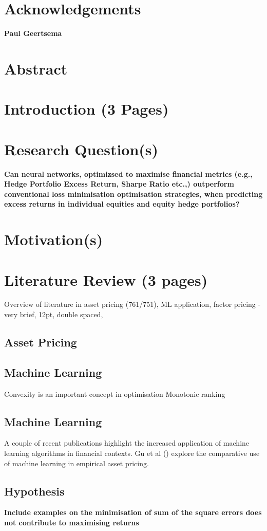 \documentclass[10pt]{article}
\begin{document}
\section{Acknowledgements}
\begin{center}
	\textbf{Paul Geertsema}
\end{center}
\newpage
\section{Abstract}
\newpage
\section{Introduction (3 Pages)}
\newpage
\section{Research Question(s)}
\textbf{Can neural networks, optimizsed to maximise financial metrics (e.g., Hedge Portfolio Excess Return, Sharpe Ratio etc.,) outperform conventional loss minimisation optimisation strategies,
when predicting excess returns in individual equities and equity hedge portfolios?}
\section{Motivation(s)}
\section{Literature Review (3 pages)}\label{LR}
Overview of literature in asset pricing (761/751), ML application, factor pricing - very brief, 12pt, double spaced,
\subsection{Asset Pricing}
\subsection{Machine Learning}
Convexity is an important concept in optimisation
Monotonic ranking
\subsection{Machine Learning}
A couple of recent publications highlight the increased application of machine learning algorithms in financial contexts.
\cite{corporate-culture}
Gu et al (\citeyear{eapvml}) explore the comparative use of machine learning in empirical asset pricing.
\subsection{Hypothesis}
\textbf{Include examples on the minimisation of sum of the square errors does not contribute to maximising returns}
\newpage
\end{document}
